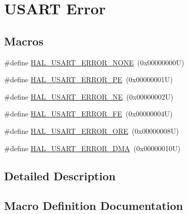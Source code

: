 \hypertarget{group___u_s_a_r_t___error}{}\section{U\+S\+A\+RT Error}
\label{group___u_s_a_r_t___error}
\subsection*{Macros}
\begin{DoxyCompactItemize}
\item 
\#define \hyperlink{group___u_s_a_r_t___error_ga17532bdd4160fffddb630e7c8bcbb2f6}{H\+A\+L\+\_\+\+U\+S\+A\+R\+T\+\_\+\+E\+R\+R\+O\+R\+\_\+\+N\+O\+NE}~(0x00000000\+U)
\item 
\#define \hyperlink{group___u_s_a_r_t___error_ga269cd569ad4cdd7f71fb981a4ab1f798}{H\+A\+L\+\_\+\+U\+S\+A\+R\+T\+\_\+\+E\+R\+R\+O\+R\+\_\+\+PE}~(0x00000001\+U)
\item 
\#define \hyperlink{group___u_s_a_r_t___error_ga249f36e7ac22c4f4bce2f4ab8b8341a4}{H\+A\+L\+\_\+\+U\+S\+A\+R\+T\+\_\+\+E\+R\+R\+O\+R\+\_\+\+NE}~(0x00000002\+U)
\item 
\#define \hyperlink{group___u_s_a_r_t___error_ga34fc0a7c8c2485f49c12d86c731d4a8b}{H\+A\+L\+\_\+\+U\+S\+A\+R\+T\+\_\+\+E\+R\+R\+O\+R\+\_\+\+FE}~(0x00000004\+U)
\item 
\#define \hyperlink{group___u_s_a_r_t___error_gae9a3360202080eefcffba1defac9e2a9}{H\+A\+L\+\_\+\+U\+S\+A\+R\+T\+\_\+\+E\+R\+R\+O\+R\+\_\+\+O\+RE}~(0x00000008\+U)
\item 
\#define \hyperlink{group___u_s_a_r_t___error_ga49cb372d5bf22d7de63b4ab1579a3527}{H\+A\+L\+\_\+\+U\+S\+A\+R\+T\+\_\+\+E\+R\+R\+O\+R\+\_\+\+D\+MA}~(0x00000010\+U)
\end{DoxyCompactItemize}


\subsection{Detailed Description}


\subsection{Macro Definition Documentation}
\mbox{\label{group___u_s_a_r_t___error_ga49cb372d5bf22d7de63b4ab1579a3527}} 
